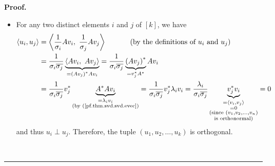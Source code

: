 \documentclass[numbers=enddot,12pt,final,onecolumn,notitlepage]{scrartcl}%
\numberwithin{exer}{subsection}
\theoremstyle{definition}
\newenvironment{proof}[1][Proof]{\noindent\textbf{#1.} }{\ \rule{0.5em}{0.5em}}
\begin{document}
\begin{proof}
\begin{itemize}
\item For any two distinct elements $i$ and $j$ of $\left[  k\right]  $, we
have%
\begin{align*}
\left\langle u_{i},u_{j}\right\rangle  &  =\left\langle \dfrac{1}{\sigma_{i}%
}Av_{i},\ \dfrac{1}{\sigma_{j}}Av_{j}\right\rangle \ \ \ \ \ \ \ \ \ \ \left(
\text{by the definitions of }u_{i}\text{ and }u_{j}\right) \\
&  =\dfrac{1}{\sigma_{i}\overline{\sigma_{j}}}\underbrace{\left\langle
Av_{i},\ Av_{j}\right\rangle }_{=\left(  Av_{j}\right)  ^{\ast}Av_{i}}%
=\dfrac{1}{\sigma_{i}\overline{\sigma_{j}}}\underbrace{\left(  Av_{j}\right)
^{\ast}}_{=v_{j}^{\ast}A^{\ast}}Av_{i}\\
&  =\dfrac{1}{\sigma_{i}\overline{\sigma_{j}}}v_{j}^{\ast}\underbrace{A^{\ast
}Av_{i}}_{\substack{=\lambda_{i}v_{i}\\\text{(by (\ref{pf.thm.svd.svd.evec})}%
}}=\dfrac{1}{\sigma_{i}\overline{\sigma_{j}}}v_{j}^{\ast}\lambda_{i}%
v_{i}=\dfrac{\lambda_{i}}{\sigma_{i}\overline{\sigma_{j}}}\underbrace{v_{j}%
^{\ast}v_{i}}_{\substack{=\left\langle v_{i},v_{j}\right\rangle
\\=0\\\text{(since }\left(  v_{1},v_{2},\ldots,v_{n}\right)  \\\text{is
orthonormal)}}}=0
\end{align*}
and thus $u_{i}\perp u_{j}$. Therefore, the tuple $\left(  u_{1},u_{2}%
,\ldots,u_{k}\right)  $ is orthogonal.


\end{itemize}
\end{proof}
\end{document}
